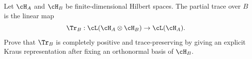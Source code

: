 Let $\cH_A$ and $\cH_B$ be finite-dimensional Hilbert spaces. The partial trace over $B$ is the linear map
$$
\Tr_B:
\cL(\cH_A\otimes\cH_B)
\to
\cL(\cH_A).
$$
Prove that $\Tr_B$ is completely positive and trace-preserving by giving an explicit Kraus representation after fixing an orthonormal basis of $\cH_B$.
